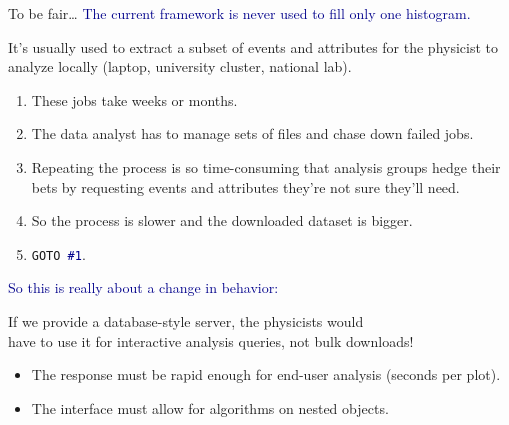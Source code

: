 \documentclass[aspectratio=169]{beamer}
\begin{document}
\begin{frame}{To be fair\ldots}
\vspace{0.5 cm}
\large \textcolor{darkblue}{The current framework is never used to fill only one histogram.}

\vspace{0.5 cm}
It's usually used to extract a subset of events and attributes for the physicist to analyze locally (laptop, university cluster, national lab).

\vspace{0.25 cm}
\begin{enumerate}
\item<2-> These jobs take weeks or months.
\item<3-> The data analyst has to manage sets of files and chase down failed jobs.
\item<4-> Repeating the process is so time-consuming that analysis groups hedge their bets by requesting events and attributes they're not sure they'll need.
\item<5-> So the process is slower and the downloaded dataset is bigger.
\item<6-> {\tt\normalsize GOTO \textcolor{darkblue}{\#1}}.
\end{enumerate}
\end{frame}

\begin{frame}{}
\vspace{0.5 cm}
\begin{center}
\Large \textcolor{darkblue}{So this is really about a change in behavior:}

\vspace{0.5 cm}
If we provide a database-style server, the physicists would \\ have to use it for interactive analysis queries, not bulk downloads!

\vspace{0.75 cm}
\large
\begin{minipage}{0.8\linewidth}
\begin{itemize}
\item<2-> The response must be rapid enough for end-user analysis (seconds per plot).
\item<3-> The interface must allow for algorithms on nested objects.
\end{itemize}
\end{minipage}
\end{center}
\end{frame}
\end{document}

